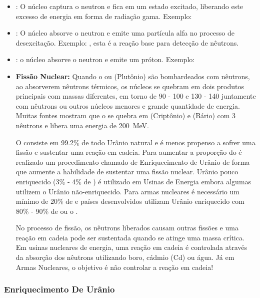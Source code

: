 \documentclass[11pt,a4paper]{article}
\begin{document}
    \begin{itemize}
		\item {}: O núcleo captura o neutron e fica em um estado excitado, liberando este excesso de energia em forma de radiação gama. Exemplo: 
		
		\item {}: O núcleo absorve o neutron e emite uma partícula alfa no processo de desexcitação. Exemplo: , esta é a reação base para detecção de nêutrons.
		
		\item {}: o núcleo absorve o neutron e emite um próton. Exemplo: 
		
		\item \textbf{Fissão Nuclear:} Quando o  ou  (Plutônio) são bombardeados com nêutrons, ao absorverem nêutrons térmicos, os núcleos se quebram em dois produtos principais com massas diferentes, em torno de 90 - 100 e 130 - 140 juntamente com nêutrons ou outros núcleos menores e grande quantidade de energia. Muitas fontes mostram que o  se quebra em  (Criptônio) e  (Bário) com 3 nêutrons e libera uma energia de \qty{200}{MeV}.
		
		O  consiste em 99.2\% de todo Urânio natural e é menos propenso a sofrer uma fissão e  sustentar uma reação em cadeia. Para aumentar a proporção do  é realizado um procedimento chamado de Enriquecimento de Urânio de forma que aumente a habilidade de sustentar uma fissão nuclear. Urânio pouco enriquecido (3\% - 4\% de ) é utilizado em Usinas de Energia embora algumas utilizem o Urânio não-enriquecido. Para armas nucleares é necessário um mínimo de 20\% de  e países desenvolvidos utilizam Urânio enriquecido com 80\% - 90\% de  ou o .

		No processo de fissão, os nêutrons liberados causam outras fissões e uma reação em cadeia pode ser sustentada quando se atinge uma massa crítica. Em usinas nucleares de energia, uma reação em cadeia é controlada através da absorção dos nêutrons utilizando boro, cádmio (Cd) ou água. Já em Armas Nucleares, o objetivo é não controlar a reação em cadeia! 
	\end{itemize}

\subsubsection*{Enriquecimento De Urânio}
\end{document}
